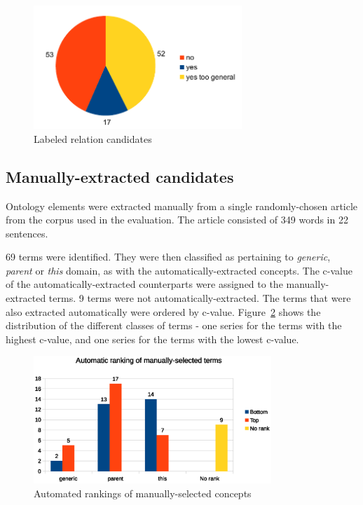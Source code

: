 \documentclass[a4paper]{report}
\begin{document}
\begin{figure}
  \centering
  \includegraphics[width=0.7\textwidth]{graphics/labeled-relations}
  \caption{Labeled relation candidates}
  \label{fig:rel-cands}
\end{figure}

\subsection{Manually-extracted candidates}

Ontology elements were extracted manually from a single randomly-chosen article from the corpus used in the evaluation.
The article consisted of 349 words in 22 sentences.

69 terms were identified.
They were then classified as pertaining to \emph{generic}, \emph{parent} or \emph{this} domain, as with the automatically-extracted concepts.
The c-value of the automatically-extracted counterparts were assigned to the manually-extracted terms.
9 terms were not automatically-extracted.
The terms that were also extracted automatically were ordered by c-value.
Figure~\ref{fig:concepts-manual} shows the distribution of the different classes of terms - one series for the terms with the highest c-value, and one series for the terms with the lowest c-value.

\begin{figure}
  \centering
  \includegraphics[width=0.8\textwidth]{graphics/concepts-manual.eps}
  \caption{Automated rankings of manually-selected concepts}
  \label{fig:concepts-manual}
\end{figure}
\end{document}
